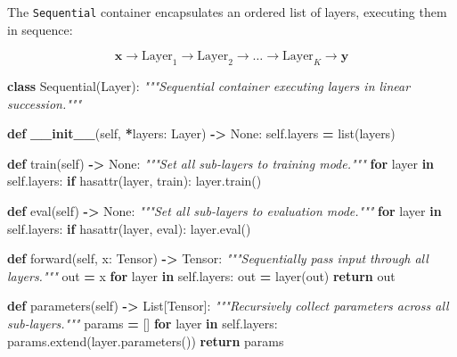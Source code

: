 \documentclass[
  letterpaper,
]{scrbook}
\newenvironment{Shaded}{\begin{snugshade}}{\end{snugshade}}
\newcommand{\BuiltInTok}[1]{#1}
\newcommand{\CommentTok}[1]{\textcolor[rgb]{0.56,0.35,0.01}{\textit{#1}}}
\newcommand{\ControlFlowTok}[1]{\textcolor[rgb]{0.13,0.29,0.53}{\textbf{#1}}}
\newcommand{\FunctionTok}[1]{\textcolor[rgb]{0.13,0.29,0.53}{\textbf{#1}}}
\newcommand{\KeywordTok}[1]{\textcolor[rgb]{0.13,0.29,0.53}{\textbf{#1}}}
\newcommand{\NormalTok}[1]{#1}
\newcommand{\OperatorTok}[1]{\textcolor[rgb]{0.81,0.36,0.00}{\textbf{#1}}}
\newcommand{\StringTok}[1]{\textcolor[rgb]{0.31,0.60,0.02}{#1}}
\newcommand{\VariableTok}[1]{\textcolor[rgb]{0.00,0.00,0.00}{#1}}
\begin{document}
The \texttt{Sequential} container encapsulates an ordered list of
layers, executing them in sequence:

\[\mathbf{x} \longrightarrow \text{Layer}_1 \longrightarrow \text{Layer}_2 \longrightarrow \dots \longrightarrow \text{Layer}_K \longrightarrow \mathbf{y}\]

\begin{Shaded}
\begin{Highlighting}[]
\KeywordTok{class}\NormalTok{ Sequential(Layer):}
    \CommentTok{"""Sequential container executing layers in linear succession."""}

    \KeywordTok{def} \FunctionTok{\_\_init\_\_}\NormalTok{(}\VariableTok{self}\NormalTok{, }\OperatorTok{*}\NormalTok{layers: Layer) }\OperatorTok{{-}\textgreater{}} \VariableTok{None}\NormalTok{:}
        \VariableTok{self}\NormalTok{.layers }\OperatorTok{=} \BuiltInTok{list}\NormalTok{(layers)}

    \KeywordTok{def}\NormalTok{ train(}\VariableTok{self}\NormalTok{) }\OperatorTok{{-}\textgreater{}} \VariableTok{None}\NormalTok{:}
        \CommentTok{"""Set all sub{-}layers to training mode."""}
        \ControlFlowTok{for}\NormalTok{ layer }\KeywordTok{in} \VariableTok{self}\NormalTok{.layers:}
            \ControlFlowTok{if} \BuiltInTok{hasattr}\NormalTok{(layer, }\StringTok{\textquotesingle{}train\textquotesingle{}}\NormalTok{):}
\NormalTok{                layer.train()}

    \KeywordTok{def} \BuiltInTok{eval}\NormalTok{(}\VariableTok{self}\NormalTok{) }\OperatorTok{{-}\textgreater{}} \VariableTok{None}\NormalTok{:}
        \CommentTok{"""Set all sub{-}layers to evaluation mode."""}
        \ControlFlowTok{for}\NormalTok{ layer }\KeywordTok{in} \VariableTok{self}\NormalTok{.layers:}
            \ControlFlowTok{if} \BuiltInTok{hasattr}\NormalTok{(layer, }\StringTok{\textquotesingle{}eval\textquotesingle{}}\NormalTok{):}
\NormalTok{                layer.}\BuiltInTok{eval}\NormalTok{()}

    \KeywordTok{def}\NormalTok{ forward(}\VariableTok{self}\NormalTok{, x: Tensor) }\OperatorTok{{-}\textgreater{}}\NormalTok{ Tensor:}
        \CommentTok{"""Sequentially pass input through all layers."""}
\NormalTok{        out }\OperatorTok{=}\NormalTok{ x}
        \ControlFlowTok{for}\NormalTok{ layer }\KeywordTok{in} \VariableTok{self}\NormalTok{.layers:}
\NormalTok{            out }\OperatorTok{=}\NormalTok{ layer(out)}
        \ControlFlowTok{return}\NormalTok{ out}

    \KeywordTok{def}\NormalTok{ parameters(}\VariableTok{self}\NormalTok{) }\OperatorTok{{-}\textgreater{}}\NormalTok{ List[Tensor]:}
        \CommentTok{"""Recursively collect parameters across all sub{-}layers."""}
\NormalTok{        params }\OperatorTok{=}\NormalTok{ []}
        \ControlFlowTok{for}\NormalTok{ layer }\KeywordTok{in} \VariableTok{self}\NormalTok{.layers:}
\NormalTok{            params.extend(layer.parameters())}
        \ControlFlowTok{return}\NormalTok{ params}


\end{Highlighting}
\end{Shaded}
\end{document}
